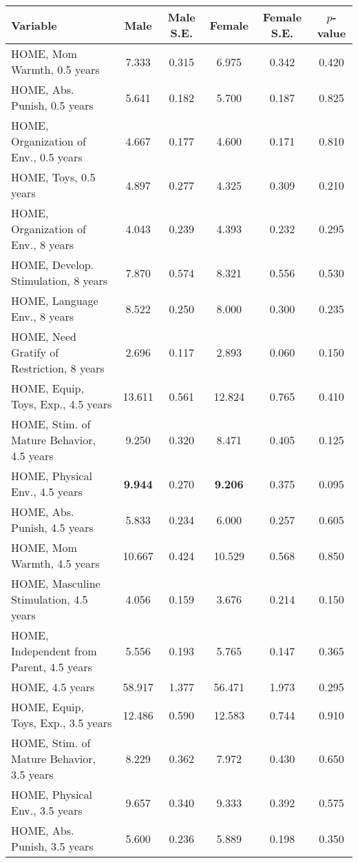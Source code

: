 \begin{tabular}{l c c c c c}
\toprule
\textbf{Variable} & \textbf{Male} & \textbf{Male S.E.}  & \textbf{Female} & \textbf{Female S.E.} & \textbf{$ p $-value} \\
\midrule
HOME, Mom Warmth, 0.5 years & 7.333 & 0.315 &  6.975 & 0.342 & 0.420 \\
HOME, Abs. Punish, 0.5 years & 5.641 & 0.182 &  5.700 & 0.187 & 0.825 \\
HOME, Organization of Env., 0.5 years & 4.667 & 0.177 &  4.600 & 0.171 & 0.810 \\
HOME, Toys, 0.5 years & 4.897 & 0.277 &  4.325 & 0.309 & 0.210 \\
HOME, Organization of Env., 8 years & 4.043 & 0.239 &  4.393 & 0.232 & 0.295 \\
HOME, Develop. Stimulation, 8 years & 7.870 & 0.574 &  8.321 & 0.556 & 0.530 \\
HOME, Language Env., 8 years & 8.522 & 0.250 &  8.000 & 0.300 & 0.235 \\
HOME, Need Gratify of Restriction, 8 years & 2.696 & 0.117 &  2.893 & 0.060 & 0.150 \\
HOME, Equip, Toys, Exp., 4.5 years & 13.611 & 0.561 &  12.824 & 0.765 & 0.410 \\
HOME, Stim. of Mature Behavior, 4.5 years & 9.250 & 0.320 &  8.471 & 0.405 & 0.125 \\
HOME, Physical Env., 4.5 years & \textbf{9.944} & 0.270 &  \textbf{9.206} & 0.375 & 0.095 \\
HOME, Abs. Punish, 4.5 years & 5.833 & 0.234 &  6.000 & 0.257 & 0.605 \\
HOME, Mom Warmth, 4.5 years & 10.667 & 0.424 &  10.529 & 0.568 & 0.850 \\
HOME, Masculine Stimulation, 4.5 years & 4.056 & 0.159 &  3.676 & 0.214 & 0.150 \\
HOME, Independent from Parent, 4.5 years & 5.556 & 0.193 &  5.765 & 0.147 & 0.365 \\
HOME, 4.5 years & 58.917 & 1.377 &  56.471 & 1.973 & 0.295 \\
HOME, Equip, Toys, Exp., 3.5 years & 12.486 & 0.590 &  12.583 & 0.744 & 0.910 \\
HOME, Stim. of Mature Behavior, 3.5 years & 8.229 & 0.362 &  7.972 & 0.430 & 0.650 \\
HOME, Physical Env., 3.5 years & 9.657 & 0.340 &  9.333 & 0.392 & 0.575 \\
HOME, Abs. Punish, 3.5 years & 5.600 & 0.236 &  5.889 & 0.198 & 0.350 \\

\end{tabular}
